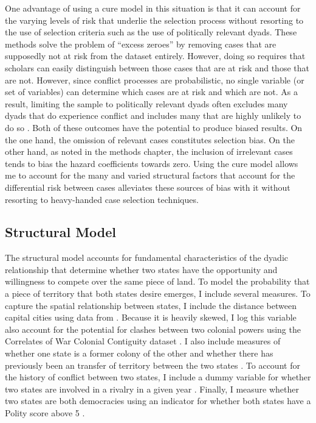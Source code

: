 One advantage of using a cure model in this situation is that it can account for the varying levels of risk that underlie the selection process without resorting to the use of selection criteria such as the use of politically relevant dyads. These methods solve the problem of “excess zeroes” by removing cases that are supposedly not at risk from the dataset entirely. However, doing so requires that scholars can easily distinguish between those cases that are at risk and those that are not. However, since conflict processes are probabilistic, no single variable (or set of variables) can determine which cases are at risk and which are not. As a result, limiting the sample to politically relevant dyads often excludes many dyads that do experience conflict and includes many that are highly unlikely to do so \citep{lemke2001}. Both of these outcomes have the potential to produce biased results. On the one hand, the omission of relevant cases constitutes selection bias. On the other hand, as noted in the methods chapter, the inclusion of irrelevant cases tends to bias the hazard coefficients towards zero. Using the cure model allows me to account for the many and varied structural factors that account for the differential risk between cases alleviates these sources of bias with it without resorting to heavy-handed case selection techniques.

\subsection{Structural Model}


The structural model accounts for fundamental characteristics of the dyadic relationship that determine whether two states have the opportunity and willingness to compete over the same piece of land. To model the probability that a piece of territory that both states desire emerges, I include several measures. To capture the spatial relationship between states, I include the distance between capital cities using data from \citet{bennett2000, stinnett2002}. Because it is heavily skewed, I log this variable also account for the potential for clashes between two colonial powers using the Correlates of War Colonial Contiguity dataset \citep{cow2020}. I also include measures of whether one state is a former colony of the other \citep{hensel2018} and whether there has previously been an transfer of territory between the two states \citep{tir1998}. To account for the history of conflict between two states, I include a dummy variable for whether two states are involved in a rivalry in a given year \citep{colaresi2007}. Finally, I measure whether two states are both democracies using an indicator for whether both states have a Polity score above 5 \citep{marshall2013}.

